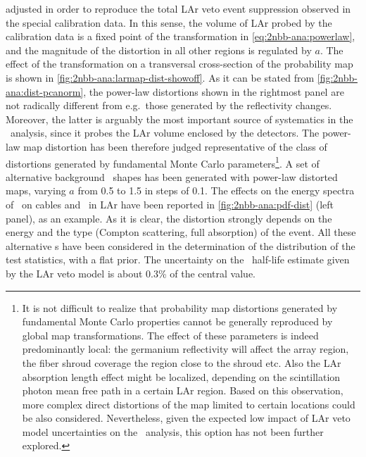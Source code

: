 \begin{description}[wide]
    adjusted in order to reproduce the total LAr veto event suppression observed in the
    special calibration data. In this sense, the volume of LAr probed by the calibration
    data is a fixed point of the transformation in \cref{eq:2nbb-ana:powerlaw}, and the
    magnitude of the distortion in all other regions is regulated by $a$. The effect of
    the transformation on a transversal cross-section of the probability map is shown in
    \cref{fig:2nbb-ana:larmap-dist-showoff}.
    \newpar
    As it can be stated from \cref{fig:2nbb-ana:dist-pcanorm}, the power-law distortions
    shown in the rightmost panel are not radically different from e.g.~those generated by
    the reflectivity changes. Moreover, the latter is arguably the most important source
    of systematics in the \nnbb\ analysis, since it probes the LAr volume enclosed by the
    detectors. The power-law map distortion has been therefore judged representative
    of the class of distortions generated by fundamental Monte Carlo parameters\footnote{%
      It is not difficult to realize that probability map distortions generated by
      fundamental Monte Carlo properties cannot be generally reproduced by global map
      transformations. The effect of these parameters is indeed predominantly local: the
      germanium reflectivity will affect the array region, the fiber shroud coverage the
      region close to the shroud etc. Also the LAr absorption length effect might be
      localized, depending on the scintillation photon mean free path in a certain LAr
      region.  Based on this observation, more complex direct distortions of the map
      limited to certain locations could be also considered. Nevertheless, given the
      expected low impact of LAr veto model uncertainties on the \nnbb\ analysis, this
      option has not been further explored.
    }.
    \newpar
    A set of alternative background \pdf\ shapes has been generated with power-law distorted
    maps, varying $a$ from 0.5 to 1.5 in steps of 0.1. The effects on the energy
    spectra of \kvn\ on cables and \kvz\ in LAr have been reported in
    \cref{fig:2nbb-ana:pdf-dist} (left panel), as an example. As it is clear, the
    distortion strongly depends on the energy and the type (Compton scattering, full
    absorption) of the event. All these alternative \pdf{}s have been considered in the
    determination of the distribution of the test statistics, with a flat prior. The
    uncertainty on the \nnbb\ half-life estimate given by the LAr veto model is about
    0.3\% of the central value.


\end{description}
